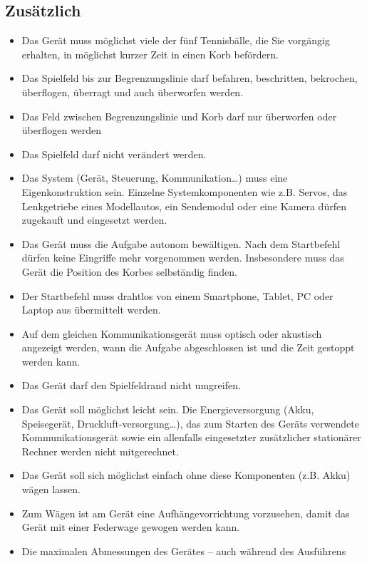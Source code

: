 \documentclass[a4paper,10pt,fleqn]{article}
\begin{document}
\subsection{Zusätzlich}
\begin{itemize}
    \item Das Gerät muss möglichst viele der fünf Tennisbälle, die Sie 
        vorgängig erhalten, in möglichst kurzer Zeit in einen Korb befördern. 
    \item Das Spielfeld bis zur Begrenzungslinie darf befahren, beschritten, 
        bekrochen, überflogen, überragt und auch überworfen werden.
    \item Das Feld zwischen Begrenzungslinie und Korb darf nur überworfen oder 
        überflogen werden
    \item Das Spielfeld darf nicht verändert werden.
    \item Das System (Gerät, Steuerung, Kommunikation…) muss eine 
        Eigenkonstruktion sein. Einzelne Systemkomponenten wie z.B. Servos, 
        das Lenkgetriebe eines Modellautos, ein Sendemodul oder eine Kamera 
        dürfen zugekauft und eingesetzt werden.  
    \item Das Gerät muss die Aufgabe autonom bewältigen. Nach dem Startbefehl 
        dürfen keine Eingriffe mehr vorgenommen werden. Insbesondere muss das 
        Gerät die Position des Korbes selbständig finden.  
    \item Der Startbefehl muss drahtlos von einem Smartphone, Tablet, PC oder 
        Laptop aus übermittelt 
        werden. 
    \item Auf dem gleichen Kommunikationsgerät muss optisch oder akustisch 
        angezeigt werden, wann die Aufgabe abgeschlossen ist und die Zeit 
        gestoppt werden kann. 
    \item Das Gerät darf den Spielfeldrand nicht umgreifen. 
    \item Das Gerät soll möglichst leicht sein. Die Energieversorgung (Akku, 
        Speisegerät, Druckluft-versorgung…), das zum Starten des Geräts 
        verwendete Kommunikationsgerät sowie ein allenfalls eingesetzter 
        zusätzlicher stationärer Rechner werden nicht mitgerechnet. 
    \item Das Gerät soll sich möglichst einfach ohne diese Komponenten (z.B. 
        Akku) wägen lassen. 
    \item Zum Wägen ist am Gerät eine Aufhängevorrichtung vorzusehen, damit 
        das Gerät mit einer Federwage gewogen werden kann. 
    \item Die maximalen Abmessungen des Gerätes – auch während des Ausführens 

\end{itemize}
\end{document}
